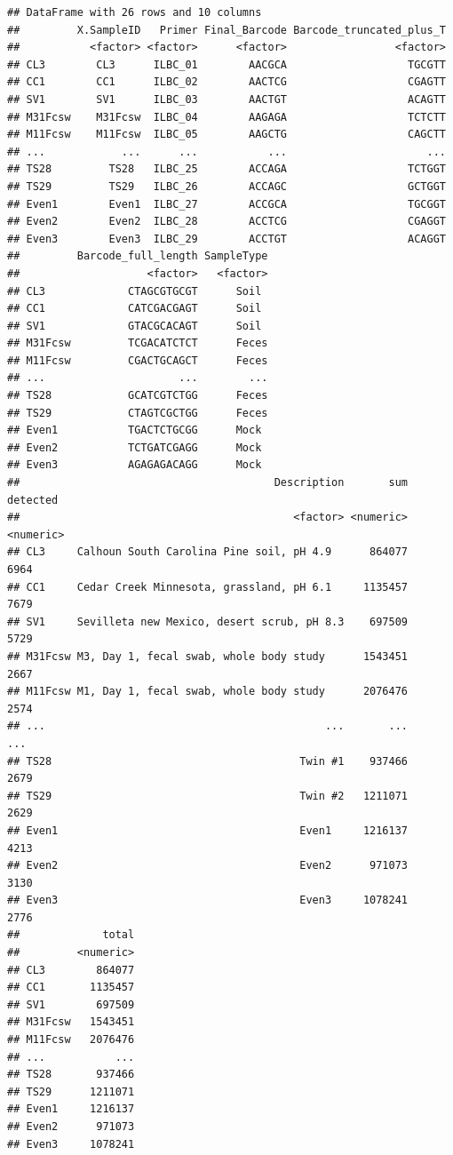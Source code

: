 \documentclass[
]{book}
\begin{document}
\begin{verbatim}
## DataFrame with 26 rows and 10 columns
##         X.SampleID   Primer Final_Barcode Barcode_truncated_plus_T
##           <factor> <factor>      <factor>                 <factor>
## CL3        CL3      ILBC_01        AACGCA                   TGCGTT
## CC1        CC1      ILBC_02        AACTCG                   CGAGTT
## SV1        SV1      ILBC_03        AACTGT                   ACAGTT
## M31Fcsw    M31Fcsw  ILBC_04        AAGAGA                   TCTCTT
## M11Fcsw    M11Fcsw  ILBC_05        AAGCTG                   CAGCTT
## ...            ...      ...           ...                      ...
## TS28         TS28   ILBC_25        ACCAGA                   TCTGGT
## TS29         TS29   ILBC_26        ACCAGC                   GCTGGT
## Even1        Even1  ILBC_27        ACCGCA                   TGCGGT
## Even2        Even2  ILBC_28        ACCTCG                   CGAGGT
## Even3        Even3  ILBC_29        ACCTGT                   ACAGGT
##         Barcode_full_length SampleType
##                    <factor>   <factor>
## CL3             CTAGCGTGCGT      Soil 
## CC1             CATCGACGAGT      Soil 
## SV1             GTACGCACAGT      Soil 
## M31Fcsw         TCGACATCTCT      Feces
## M11Fcsw         CGACTGCAGCT      Feces
## ...                     ...        ...
## TS28            GCATCGTCTGG      Feces
## TS29            CTAGTCGCTGG      Feces
## Even1           TGACTCTGCGG      Mock 
## Even2           TCTGATCGAGG      Mock 
## Even3           AGAGAGACAGG      Mock 
##                                        Description       sum  detected
##                                           <factor> <numeric> <numeric>
## CL3     Calhoun South Carolina Pine soil, pH 4.9      864077      6964
## CC1     Cedar Creek Minnesota, grassland, pH 6.1     1135457      7679
## SV1     Sevilleta new Mexico, desert scrub, pH 8.3    697509      5729
## M31Fcsw M3, Day 1, fecal swab, whole body study      1543451      2667
## M11Fcsw M1, Day 1, fecal swab, whole body study      2076476      2574
## ...                                            ...       ...       ...
## TS28                                       Twin #1    937466      2679
## TS29                                       Twin #2   1211071      2629
## Even1                                      Even1     1216137      4213
## Even2                                      Even2      971073      3130
## Even3                                      Even3     1078241      2776
##             total
##         <numeric>
## CL3        864077
## CC1       1135457
## SV1        697509
## M31Fcsw   1543451
## M11Fcsw   2076476
## ...           ...
## TS28       937466
## TS29      1211071
## Even1     1216137
## Even2      971073
## Even3     1078241
\end{verbatim}
\end{document}
